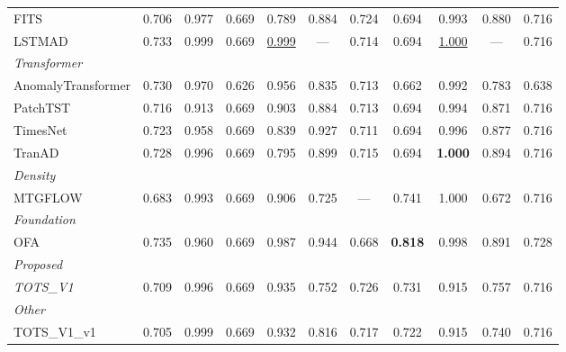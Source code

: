 \begin{table}[t]
\begin{tabular}{lcccccccccc}
FITS & 0.706 & 0.977 & 0.669 & 0.789 & 0.884 & 0.724 & 0.694 & 0.993 & 0.880 & 0.716 \\
LSTMAD & 0.733 & 0.999 & 0.669 & \underline{0.999} & --- & 0.714 & 0.694 & \underline{1.000} & --- & 0.716 \\
\midrule
\multicolumn{11}{l}{\textit{Transformer}} \\
AnomalyTransformer & 0.730 & 0.970 & 0.626 & 0.956 & 0.835 & 0.713 & 0.662 & 0.992 & 0.783 & 0.638 \\
PatchTST & 0.716 & 0.913 & 0.669 & 0.903 & 0.884 & 0.713 & 0.694 & 0.994 & 0.871 & 0.716 \\
TimesNet & 0.723 & 0.958 & 0.669 & 0.839 & 0.927 & 0.711 & 0.694 & 0.996 & 0.877 & 0.716 \\
TranAD & 0.728 & 0.996 & 0.669 & 0.795 & 0.899 & 0.715 & 0.694 & \textbf{1.000} & 0.894 & 0.716 \\
\midrule
\multicolumn{11}{l}{\textit{Density}} \\
MTGFLOW & 0.683 & 0.993 & 0.669 & 0.906 & 0.725 & --- & 0.741 & 1.000 & 0.672 & 0.716 \\
\midrule
\multicolumn{11}{l}{\textit{Foundation}} \\
OFA & 0.735 & 0.960 & 0.669 & 0.987 & 0.944 & 0.668 & \textbf{0.818} & 0.998 & 0.891 & 0.728 \\
\midrule
\multicolumn{11}{l}{\textit{Proposed}} \\
\textit{TOTS\_V1} & 0.709 & 0.996 & 0.669 & 0.935 & 0.752 & 0.726 & 0.731 & 0.915 & 0.757 & 0.716 \\
\midrule
\multicolumn{11}{l}{\textit{Other}} \\
TOTS\_V1\_v1 & 0.705 & 0.999 & 0.669 & 0.932 & 0.816 & 0.717 & 0.722 & 0.915 & 0.740 & 0.716 \\
\bottomrule
\end{tabular}
\end{table}

